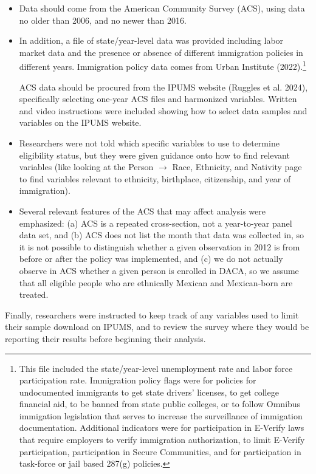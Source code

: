 \documentclass[
  letterpaper,
  DIV=11,
  numbers=noendperiod]{scrartcl}
\begin{document}
\begin{itemize}
\item
  Data should come from the American Community Survey (ACS), using data
  no older than 2006, and no newer than 2016.
\item
  In addition, a file of state/year-level data was provided including
  labor market data and the presence or absence of different immigration
  policies in different years. Immigration policy data comes from Urban
  Institute (2022).\footnote{This file included the state/year-level
    unemployment rate and labor force participation rate. Immigration
    policy flags were for policies for undocumented immigrants to get
    state drivers' licenses, to get college financial aid, to be banned
    from state public colleges, or to follow Omnibus immigation
    legislation that serves to increase the surveillance of immigation
    documentation. Additional indicators were for participation in
    E-Verify laws that require employers to verify immigration
    authorization, to limit E-Verify participation, participation in
    Secure Communities, and for participation in task-force or jail
    based 287(g) policies.}

  ACS data should be procured from the IPUMS website (Ruggles et al.
  2024), specifically selecting one-year ACS files and harmonized
  variables. Written and video instructions were included showing how to
  select data samples and variables on the IPUMS website.
\item
  Researchers were not told which specific variables to use to determine
  eligibility status, but they were given guidance onto how to find
  relevant variables (like looking at the Person \(\rightarrow\) Race,
  Ethnicity, and Nativity page to find variables relevant to ethnicity,
  birthplace, citizenship, and year of immigration).
\item
  Several relevant features of the ACS that may affect analysis were
  emphasized: (a) ACS is a repeated cross-section, not a year-to-year
  panel data set, and (b) ACS does not list the month that data was
  collected in, so it is not possible to distinguish whether a given
  observation in 2012 is from before or after the policy was
  implemented, and (c) we do not actually observe in ACS whether a given
  person is enrolled in DACA, so we assume that all eligible people who
  are ethnically Mexican and Mexican-born are treated.
\end{itemize}

Finally, researchers were instructed to keep track of any variables used
to limit their sample download on IPUMS, and to review the survey where
they would be reporting their results before beginning their analysis.
\end{document}
